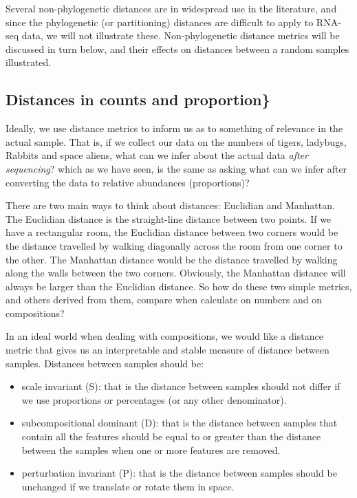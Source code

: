 \documentclass[onecolumn]{book}
\providecommand{\tightlist}{%
  \setlength{\itemsep}{0pt}\setlength{\parskip}{0pt}}
\theoremstyle{definition}
\theoremstyle{definition}
\theoremstyle{definition}
\theoremstyle{remark}
\begin{document}
Several non-phylogenetic distances are in widespread use in the
literature, and since the phylogenetic (or partitioning) distances are
difficult to apply to RNA-seq data, we will not illustrate these.
Non-phylogenetic distance metrics will be discussed in turn below, and
their effects on distances between a random samples illustrated.

\hypertarget{distances-in-counts-and-proportion}{%
\subsection{Distances in counts and
proportion\}}\label{distances-in-counts-and-proportion}}

Ideally, we use distance metrics to inform us as to something of
relevance in the actual sample. That is, if we collect our data on the
numbers of tigers, ladybugs, Rabbits and space aliens, what can we infer
about the actual data \emph{after  sequencing}? which as we have seen,
is the same as asking what can we infer after converting the data to
relative abundances (proportions)?

There are two main ways to think about distances: Euclidian and
Manhattan. The Euclidian distance is the straight-line distance between
two points. If we have a rectangular room, the Euclidian distance
between two corners would be the distance travelled by walking
diagonally across the room from one corner to the other. The Manhattan
distance would be the distance travelled by walking along the walls
between the two corners. Obviously, the Manhattan distance will always
be larger than the Euclidian distance. So how do these two simple
metrics, and others derived from them, compare when calculate on numbers
and on compositions?

In an ideal world when dealing with compositions, we would like a
distance metric that gives us an interpretable and stable measure of
distance between samples. Distances between samples should be:

\begin{itemize}
\tightlist
\item
  scale invariant (S): that is the distance between samples should not
  differ if we use proportions or percentages (or any other
  denominator).
\item
  subcompositional dominant (D): that is the distance between samples
  that contain all the features should be equal to or greater than the
  distance between the samples when one or more features are removed.
\item
  perturbation invariant (P): that is the distance between samples
  should be unchanged if we translate or rotate them in space.
\end{itemize}
\end{document}
